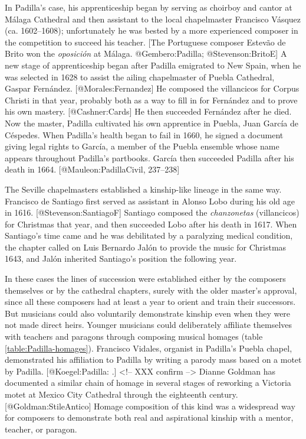 In Padilla's case, his apprenticeship began by serving as choirboy and cantor at
Málaga Cathedral and then assistant to the local chapelmaster Francisco Vásquez
(ca.  1602--1608); unfortunately he was bested by a more experienced composer in
the competition to succeed his teacher.
[The Portuguese composer Estevão de Brito won the \emph{oposición} at Málaga.
@Gembero:Padilla; @Stevenson:BritoE]
A new stage of apprenticeship began after Padilla emigrated to New Spain, when
he was selected in 1628 to assist the ailing chapelmaster of Puebla Cathedral,
Gaspar Fernández.
[@Morales:Fernandez]
He composed the villancicos for Corpus Christi in that year, probably both as a
way to fill in for Fernández and to prove his own mastery.
[@Cashner:Cards]
He then succeeded Fernández after he died.
Now the master, Padilla cultivated his own apprentice in Puebla, Juan García de
Céspedes.
When Padilla's health began to fail in 1660, he signed a 
document giving legal rights to García, a member of the Puebla ensemble whose
name appears throughout Padilla's partbooks.
García then succeeded Padilla after his death in 1664.
[@Mauleon:PadillaCivil, 237--238]

The Seville chapelmasters established a kinship-like lineage in the same way.
Francisco de Santiago first served as assistant in Alonso Lobo during his old
age in 1616. 
[@Stevenson:SantiagoF]
Santiago composed the \emph{chanzonetas} (villancicos) for Christmas that year, and
then succeeded Lobo after his death in 1617.
When Santiago's time came and he was debilitated by a paralyzing medical
condition, the chapter called on Luis Bernardo Jalón to provide the music for
Christmas 1643, and Jalón inherited Santiago's position the following year.

In these cases the lines of succession were established either by the composers
themselves or by the cathedral chapters, surely with the older master's
approval, since all these composers had at least a year to orient and train
their successors.
But musicians could also voluntarily demonstrate kinship even when they were not
made direct heirs. 
Younger musicians could deliberately affiliate themselves with teachers and
paragons through composing musical homages (table \ref{table:Padilla-homages}).
Francisco Vidales, organist in Padilla's Puebla chapel, demonstrated his
affiliation to Padilla by writing a parody mass based on a motet by Padilla.
[@Koegel:Padilla: 
.] <!-- XXX confirm -->
Dianne Goldman has documented a similar chain of homage in several stages of
reworking a Victoria motet at Mexico City Cathedral through the eighteenth
century.
[@Goldman:StileAntico]
Homage composition of this kind was a widespread way for composers to
demonstrate both real and aspirational kinship with a mentor, teacher, or
paragon.

